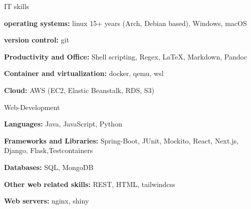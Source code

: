 

\begin{cvskills}
  \cvskill
    {IT skills} %
    {
      \begin{cvitems}
        \item {\textbf{operating systems:} linux 15+ years (Arch, Debian based), Windows, macOS}
        \item {\textbf{version control:} git}
        \item {\textbf{Productivity and Office:} Shell scripting, Regex, LaTeX, Markdown, Pandoc}
        \item {\textbf{Container and virtualization:} docker, qemu, wsl}
        \item {\textbf{Cloud:} AWS (EC2, Elastic Beanstalk, RDS, S3)}
      \end{cvitems}
      }
\cvskill
{Web-Development}%
{
  \begin{cvitems}
    \item {\textbf{Languages:} Java, JavaScript, Python}
    \item {\textbf{Frameworks and Libraries:} Spring-Boot, JUnit, Mockito, React, Next.js, Django, Flask,\newline Testcontainers}
    \item {\textbf{Databases:} SQL, MongoDB}
    \item {\textbf{Other web related skills:} REST, HTML, tailwindcss}
    \item {\textbf{Web servers:} nginx, shiny}
  \end{cvitems}
}


\end{cvskills}

